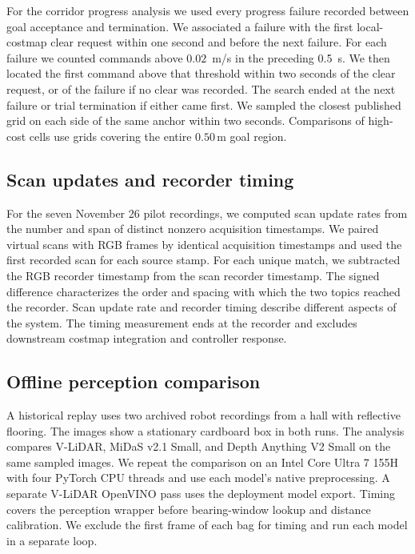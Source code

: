 \documentclass[pdflatex,sn-mathphys-num]{sn-jnl}
\newif\ifdraftreview
\newcommand{\reviewbadge}[1]{%
  \colorbox{reviewfill}{\textcolor{reviewink}{\sffamily\bfseries\strut #1}}}
\newcommand{\pending}[2]{%
  \ifdraftreview
    \hyperlink{author-checklist}{\reviewbadge{#1}}\nobreak\space
    \textcolor{reviewink}{\textbf{[Pending: #2]}}%
  \fi}
\newcommand{\vlidar}{V-LiDAR}
\newcommand{\m}{\,\mathrm{m}}
\begin{document}
For the corridor progress analysis we used every progress failure recorded between goal acceptance and termination. We associated a failure with the first local-costmap clear request within one second and before the next failure. For each failure we counted commands above $0.02$~m/s in the preceding 0.5~s. We then located the first command above that threshold within two seconds of the clear request, or of the failure if no clear was recorded. The search ended at the next failure or trial termination if either came first. We sampled the closest published grid on each side of the same anchor within two seconds. Comparisons of high-cost cells use grids covering the entire $0.50\m$ goal region.

\pending{R1}{Check that the recording inventory, reconstructed goals, and client outcome labels match the archived evidence.}

\subsection{Scan updates and recorder timing}

For the seven November 26 pilot recordings, we computed scan update rates from the number and span of distinct nonzero acquisition timestamps. We paired virtual scans with RGB frames by identical acquisition timestamps and used the first recorded scan for each source stamp. For each unique match, we subtracted the RGB recorder timestamp from the scan recorder timestamp. The signed difference characterizes the order and spacing with which the two topics reached the recorder. Scan update rate and recorder timing describe different aspects of the system. The timing measurement ends at the recorder and excludes downstream costmap integration and controller response.

\subsection{Offline perception comparison}

A historical replay uses two archived robot recordings from a hall with reflective flooring. The images show a stationary cardboard box in both runs. The analysis compares \vlidar{}, MiDaS v2.1 Small, and Depth Anything V2 Small on the same sampled images. We repeat the comparison on an Intel Core Ultra 7 155H with four PyTorch CPU threads and use each model's native preprocessing. A separate V-LiDAR OpenVINO pass uses the deployment model export. Timing covers the perception wrapper before bearing-window lookup and distance calibration. We exclude the first frame of each bag for timing and run each model in a separate loop.
\end{document}
